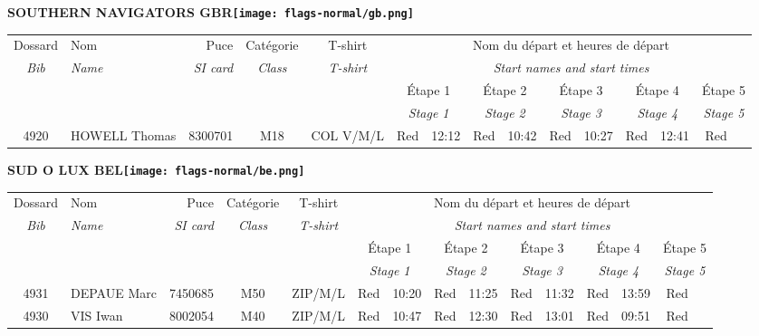 \documentclass{report}
\begin{document}
\newpage
  \Huge \centering \bfseries SOUTHERN NAVIGATORS  GBR\normalfont \footnotesize \sffamily \hfill \texttt{[image: flags-normal/gb.png]} \newline 
  \begin{longtable}{|c|l|r|c|c|*{5}{cc|}}
    Dossard & Nom  & Puce    & Catégorie & T-shirt & \multicolumn{10}{c|}{Nom du départ et heures de départ} \\
    \itshape Bib     & \itshape Name & \itshape SI card & \itshape Class  & \itshape  T-shirt  & \multicolumn{10}{c|}{\itshape Start names and start times} \\
    \hline
    & & & & & \multicolumn{2}{c|}{Étape 1} & \multicolumn{2}{c|}{Étape 2} & \multicolumn{2}{c|}{Étape 3} & \multicolumn{2}{c|}{Étape 4} & \multicolumn{2}{c|}{Étape 5} \\
    & & & & & \multicolumn{2}{c|}{\itshape Stage 1} & \multicolumn{2}{c|}{\itshape Stage 2} & \multicolumn{2}{c|}{\itshape Stage 3} & \multicolumn{2}{c|}{\itshape Stage 4} & \multicolumn{2}{c|}{\itshape Stage 5} \\
    \hline
    4920 & HOWELL Thomas & 8300701 & M18 & COL V/M/L & Red & 12:12 & Red & 10:42 & Red & 10:27 & Red & 12:41 & Red &  \\
  \end{longtable}
\newpage
  \Huge \centering \bfseries SUD O LUX  BEL\normalfont \footnotesize \sffamily \hfill \texttt{[image: flags-normal/be.png]} \newline 
  \begin{longtable}{|c|l|r|c|c|*{5}{cc|}}
    Dossard & Nom  & Puce    & Catégorie & T-shirt & \multicolumn{10}{c|}{Nom du départ et heures de départ} \\
    \itshape Bib     & \itshape Name & \itshape SI card & \itshape Class  & \itshape  T-shirt  & \multicolumn{10}{c|}{\itshape Start names and start times} \\
    \hline
    & & & & & \multicolumn{2}{c|}{Étape 1} & \multicolumn{2}{c|}{Étape 2} & \multicolumn{2}{c|}{Étape 3} & \multicolumn{2}{c|}{Étape 4} & \multicolumn{2}{c|}{Étape 5} \\
    & & & & & \multicolumn{2}{c|}{\itshape Stage 1} & \multicolumn{2}{c|}{\itshape Stage 2} & \multicolumn{2}{c|}{\itshape Stage 3} & \multicolumn{2}{c|}{\itshape Stage 4} & \multicolumn{2}{c|}{\itshape Stage 5} \\
    \hline
    4931 & DEPAUE Marc & 7450685 & M50 & ZIP/M/L & Red & 10:20 & Red & 11:25 & Red & 11:32 & Red & 13:59 & Red &  \\
    4930 & VIS Iwan & 8002054 & M40 & ZIP/M/L & Red & 10:47 & Red & 12:30 & Red & 13:01 & Red & 09:51 & Red &  \\
  \end{longtable}
\end{document}
